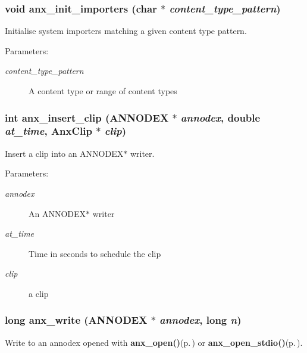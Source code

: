 \subsubsection{\setlength{\rightskip}{0pt plus 5cm}void anx\_\-init\_\-importers (char $\ast$ {\em content\_\-type\_\-pattern})}\label{anx__write_8h_a0}


Initialise system importers matching a given content type pattern. 

\begin{Desc}
\item[Parameters:]
\begin{description}
\item[{\em content\_\-type\_\-pattern}]A content type or range of content types \end{description}
\end{Desc}
\subsubsection{\setlength{\rightskip}{0pt plus 5cm}int anx\_\-insert\_\-clip ({\bf ANNODEX} $\ast$ {\em annodex}, double {\em at\_\-time}, Anx\-Clip $\ast$ {\em clip})}\label{anx__write_8h_a7}


Insert a clip into an ANNODEX$\ast$ writer. 

\begin{Desc}
\item[Parameters:]
\begin{description}
\item[{\em annodex}]An ANNODEX$\ast$ writer \item[{\em at\_\-time}]Time in seconds to schedule the clip \item[{\em clip}]a clip \end{description}
\end{Desc}
\subsubsection{\setlength{\rightskip}{0pt plus 5cm}long anx\_\-write ({\bf ANNODEX} $\ast$ {\em annodex}, long {\em n})}\label{anx__write_8h_a10}


Write to an annodex opened with {\bf anx\_\-open()}{\rm (p.\,\pageref{anx__general_8h_a3})} or {\bf anx\_\-open\_\-stdio()}{\rm (p.\,\pageref{anx__general_8h_a4})}. 

